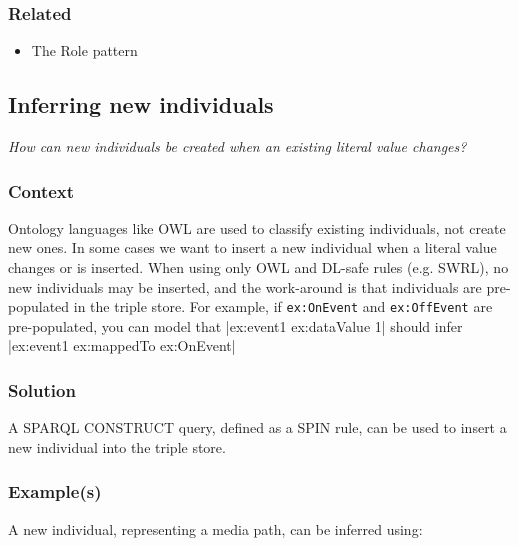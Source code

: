 \subsubsection{Related}

\begin{itemize}
	\item The Role pattern
\end{itemize}




\subsection{Inferring new individuals}

\emph{How can new individuals be created when an existing literal value changes?}

\subsubsection{Context}

Ontology languages like \ac{OWL} are used to classify existing individuals, not create new ones. In some cases we want to insert a new individual when a literal value changes or is inserted. When using only \ac{OWL} and DL-safe rules (e.g. \ac{SWRL}), no new individuals may be inserted, and the work-around is that individuals are pre-populated in the triple store. For example, if \texttt{ex:OnEvent} and \texttt{ex:OffEvent} are pre-populated, you can model that |ex:event1 ex:dataValue 1| should infer |ex:event1 ex:mappedTo ex:OnEvent|

\subsubsection{Solution}

A \ac{SPARQL} CONSTRUCT query, defined as a \ac{SPIN} rule, can be used to insert a new individual into the triple store.
 
\subsubsection{Example(s)}

A new individual, representing a media path, can be inferred using:

